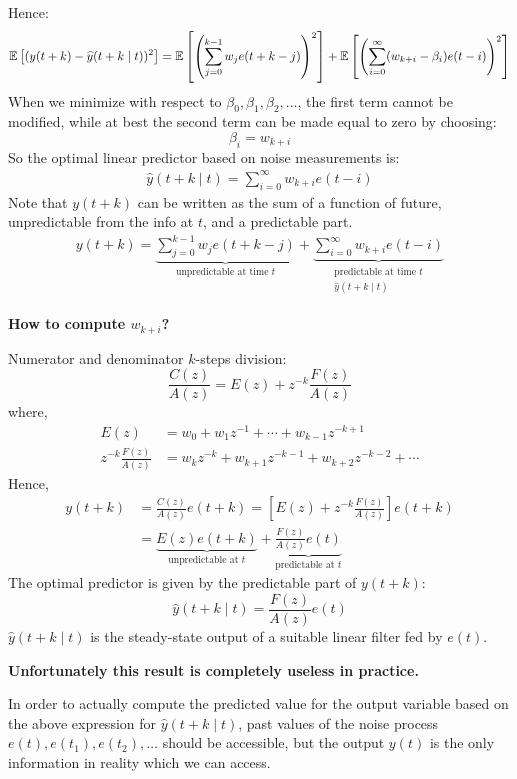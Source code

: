 Hence:
\begin{align*}
	\mathbb{E}\left[(y(t+k)-\widehat{y}(t+k \mid t))^{2}\right]=\mathbb{E}\left[\left(\sum_{j=0}^{k-1} w_{j} e(t+k-j)\right)^{2}\right]+\mathbb{E}\left[\left(\sum_{i=0}^{\infty} (w_{k+i}-\beta_{i}) e(t-i)\right)^{2}\right]
\end{align*}
When we minimize with respect to $\beta_{0}, \beta_{1}, \beta_{2}, \ldots$, the first term cannot be modified, while at best the second term can be made equal to zero by choosing:
\[
	\boxed{\beta_{i} = w_{k+i}}
\]
So the optimal linear predictor based on noise measurements is:
\begin{align*}
	\boxed{\hat{y}(t+k \mid t) = \sum_{i=0}^{\infty}w_{k+i} e(t-i)}
\end{align*}
Note that $y(t+k)$ can be written as the sum of a function of future, unpredictable from the info at $t$, and a predictable part. 
\begin{align*}
	y(t+k)= \underbrace{\sum_{j=0}^{k-1} w_{j} e(t+k-j)}_{\text{unpredictable at time $t$}} + \underbrace{\sum_{i=0}^{\infty} w_{k+i} e(t-i)}_{\substack{\text{predictable at time $t$}\\\hat{y}(t+k \mid t)}}
\end{align*}

\textbf{How to compute $w_{k+i}$?}

Numerator and denominator $k$-steps division:
\[
	\boxed{\frac{C(z)}{A(z)}=E(z)+z^{-k} \frac{F(z)}{A(z)}}
\]
where,
\begin{align*}
	E(z)&=w_{0}+w_{1} z^{-1}+\cdots+w_{k-1} z^{-k+1} \\
	z^{-k} \frac{F(z)}{A(z)}&=w_{k} z^{-k}+w_{k+1} z^{-k-1}+w_{k+2} z^{-k-2}+\cdots
\end{align*}
Hence,
\begin{align*}
	y(t+k) &=\frac{C(z)}{A(z)} e(t+k)=\left[E(z)+z^{-k} \frac{F(z)}{A(z)}\right] e(t+k)\\
	&=\underbrace{E(z)e(t+k)}_{\text{unpredictable at }t}+\underbrace{\frac{F(z)}{A(z)}e(t)}_{\text{predictable at }t}
\end{align*}
The optimal predictor is given by the predictable part of $y(t + k)$:
\[
	\boxed{\hat{y}(t+k \mid t) = \frac{F(z)}{A(z)}e(t)}
\]
$\hat{y}(t+k \mid t)$ is the steady-state output of a suitable linear filter fed by $e(t)$.

\textbf{Unfortunately this result is completely useless in practice.}

In order to actually compute the predicted value for the output variable based on the above expression for $\hat{y}(t+k \mid t)$, past values of the noise process $e(t),e(t_1),e(t_2),\ldots$ should be accessible, but the output $y(t)$ is the only information in reality which we can access.

